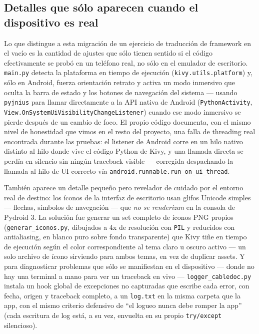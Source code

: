 \documentclass[11pt,twocolumn]{article}
\begin{document}
\subsection{Detalles que sólo aparecen cuando el dispositivo es real}

Lo que distingue a esta migración de un ejercicio de traducción de framework en el vacío es la cantidad de ajustes que sólo tienen sentido si el código efectivamente se probó en un teléfono real, no sólo en el emulador de escritorio. \texttt{main.py} detecta la plataforma en tiempo de ejecución (\texttt{kivy.utils.platform}) y, sólo en Android, fuerza orientación retrato y activa un modo inmersivo que oculta la barra de estado y los botones de navegación del sistema --- usando \texttt{pyjnius} para llamar directamente a la API nativa de Android (\texttt{PythonActivity}, \texttt{View.OnSystemUiVisibilityChangeListener}) cuando ese modo inmersivo se pierde después de un cambio de foco. El propio código documenta, con el mismo nivel de honestidad que vimos en el resto del proyecto, una falla de threading real encontrada durante las pruebas: el listener de Android corre en un hilo nativo distinto al hilo donde vive el código Python de Kivy, y una llamada directa se perdía en silencio sin ningún traceback visible --- corregida despachando la llamada al hilo de UI correcto vía \texttt{android.runnable.run\_on\_ui\_thread}.

También aparece un detalle pequeño pero revelador de cuidado por el entorno real de destino: los íconos de la interfaz de escritorio usan glifos Unicode simples --- flechas, símbolos de navegación --- que \emph{no se renderizan} en la consola de Pydroid 3. La solución fue generar un set completo de íconos PNG propios (\texttt{generar\_iconos.py}, dibujados a 4x de resolución con \texttt{PIL} y reducidos con antialiasing, en blanco puro sobre fondo transparente) que Kivy tiñe en tiempo de ejecución según el color correspondiente al tema claro u oscuro activo --- un solo archivo de ícono sirviendo para ambos temas, en vez de duplicar assets. Y para diagnosticar problemas que sólo se manifiestan en el dispositivo --- donde no hay una terminal a mano para ver un traceback en vivo --- \texttt{logger\_cabledoc.py} instala un hook global de excepciones no capturadas que escribe cada error, con fecha, origen y traceback completo, a un \texttt{log.txt} en la misma carpeta que la app, con el mismo criterio defensivo de ``el logueo nunca debe romper la app'' (cada escritura de log está, a su vez, envuelta en su propio \texttt{try/except} silencioso).
\end{document}
